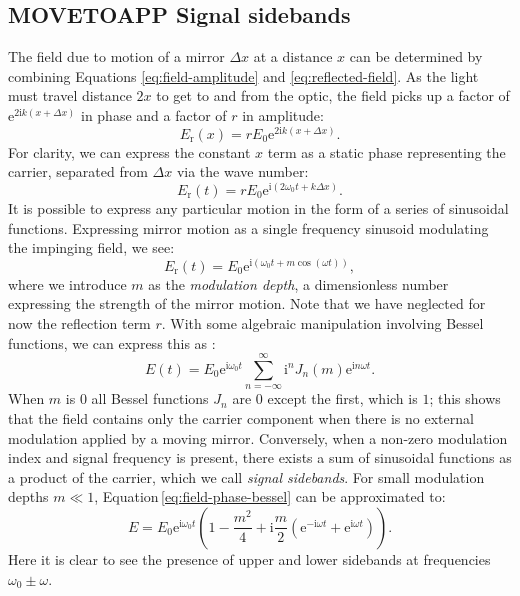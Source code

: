 \subsection{MOVETOAPP Signal sidebands}
The field due to motion of a mirror $\Delta x$ at a distance $x$ can be determined by combining Equations \ref{eq:field-amplitude} and \ref{eq:reflected-field}. As the light must travel distance $2x$ to get to and from the optic, the field picks up a factor of $\text{e}^{2\text{i}k \left( x + \Delta x \right)}$ in phase and a factor of $r$ in amplitude:
\begin{equation}
  E_{\text{r}} \left( x \right) = r E_0 \text{e}^{2\text{i} k \left( x + \Delta x \right)}.
\end{equation}
For clarity, we can express the constant $x$ term as a static phase representing the carrier, separated from $\Delta x$ via the wave number:
\begin{equation}
  \label{eq:field-amplitude-phase}
  E_{\text{r}} \left( t \right) = r E_0 \text{e}^{\text{i} \left( 2 \omega_0 t + k \Delta x\right)}.
\end{equation}
It is possible to express any particular motion in the form of a series of sinusoidal functions. Expressing mirror motion as a single frequency sinusoid modulating the impinging field, we see:
\begin{equation}
  \label{eq:field-phase-modulation}
  E_{\text{r}} \left( t \right) = E_0 \text{e}^{\text{i} \left(\omega_0 t + m \cos{\left( \omega t \right)} \right)},
\end{equation}
where we introduce $m$ as the \emph{modulation depth}, a dimensionless number expressing the strength of the mirror motion. Note that we have neglected for now the reflection term $r$. With some algebraic manipulation involving Bessel functions, we can express this as \cite{Freise2010}:
\begin{equation}
  \label{eq:field-phase-bessel}
  E \left( t \right) = E_0 \text{e}^{\text{i} \omega_0 t} \sum^{\infty}_{n=-\infty} \text{i}^n J_{n} \left( m \right) \text{e}^{\text{i} n \omega t}.
\end{equation}
When $m$ is $0$ all Bessel functions $J_{n}$ are $0$ except the first, which is $1$; this shows that the field contains only the carrier component when there is no external modulation applied by a moving mirror. Conversely, when a non-zero modulation index and signal frequency is present, there exists a sum of sinusoidal functions as a product of the carrier, which we call \emph{signal sidebands}. For small modulation depths $m \ll 1$, Equation\,\ref{eq:field-phase-bessel} can be approximated to:
\begin{equation}
  \label{eq:field-phase-mod-expanded}
  E = E_0 \text{e}^{\text{i} \omega_0 t} \left( 1 - \frac{m^2}{4} + \text{i} \frac{m}{2} \left( \text{e}^{-\text{i} \omega t} + \text{e}^{\text{i} \omega t} \right) \right).
\end{equation}
Here it is clear to see the presence of upper and lower sidebands at frequencies $\omega_0 \pm \omega$.

